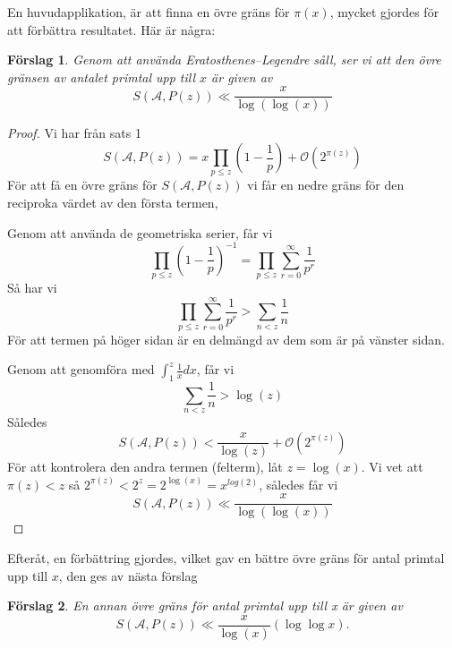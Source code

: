 \documentclass[12pt,a4paper]{article}
\newcommand{\A}{\mathcal{A}}
\newtheorem{proof}{Bevis}
\newtheorem{proposition}{Förslag}
\begin{document}
En huvudapplikation, är att finna en övre gräns för $ \pi(x) $, mycket gjordes för att förbättra resultatet. Här är några:
\begin{proposition}
Genom att använda Eratosthenes–Legendre såll, ser vi att den övre gränsen av antalet primtal upp till $ x $ är given av
\[S(\A, P(z))\ll\frac{x}{\log(\log(x))}\]
\end{proposition}
\begin{proof}
Vi har från sats 1
\[S(\A, P(z))=x \prod_{p\leq z}\left( 1-\frac{1}{p} \right) +\mathcal{O}(2^{\pi(z)})\]
För att få en övre gräns för $ S(\A, P(z)) $ vi får en nedre gräns för den reciproka värdet av den första termen, 

Genom att använda de geometriska serier, får vi
\[\prod_{p\leq z}\left( 1-\frac{1}{p} \right)^{-1}=\prod_{p\leq z}\sum_{r=0}^{\infty}\frac{1}{p^{r}}\]
Så har vi
\[\prod_{p\leq z}\sum_{r=0}^{\infty}\frac{1}{p^{r}}>\sum_{n<z}\frac{1}{n}\]
För att termen på höger sidan är en delmängd av dem som är på vänster sidan.

Genom att genomföra med $ \int_{1}^{z}\frac{1}{x}dx $, får vi
\[\sum_{n<z}\frac{1}{n}>\log(z)\]
Således
\[S(\A, P(z))<\frac{x}{\log(z)}+\mathcal{O}(2^{\pi(z)})\]
För att kontrolera den andra termen (felterm), låt $ z=\log(x)$. Vi vet att $ \pi(z)<z $ så $ 2^{\pi(z)}<2^{z}=2^{\log(x)}=x^{log(2)} $, således får vi
\[S(\A, P(z))\ll\frac{x}{\log(\log(x))}\]
\end{proof}
Efteråt, en förbättring gjordes, vilket gav en bättre övre gräns för antal primtal upp till $ x $, den ges av nästa förslag
\begin{proposition}
En annan övre gräns för antal primtal upp till x är given av
\[S(\A, P(z))\ll\frac{x}{\log(x)}(\log\log x).\]
\end{proposition}
\end{document}
